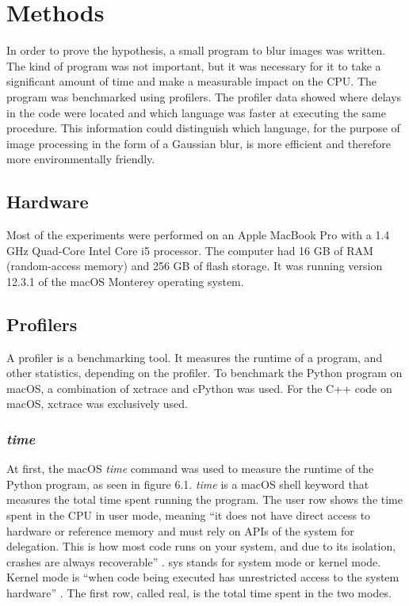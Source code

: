 \chapter{Methods}
In order to prove the hypothesis, a small program to blur images was written. The kind of program was not important, but it was necessary for it to take a significant amount of time and make a measurable impact on the CPU.
The program was benchmarked using profilers. The profiler data showed where delays in the code were located and which language was faster at executing the same procedure. This information could distinguish which language, for the purpose of image processing in the form of a Gaussian blur, is more efficient and therefore more environmentally friendly.

\section{Hardware}
Most of the experiments were performed on an Apple MacBook Pro with a 1.4 GHz Quad-Core Intel Core i5 processor. The computer had 16 GB of RAM (random-access memory) and 256 GB of flash storage. It was running version 12.3.1 of the macOS Monterey operating system.

\section{Profilers}
A profiler is a benchmarking tool. It measures the runtime of a program, and other statistics, depending on the profiler. To benchmark the Python program on macOS, a combination of xctrace and cPython was used. For the C++ code on macOS, xctrace was exclusively used.

\subsection{\textit{time}}
At first, the macOS \textit{time} command was used to measure the runtime of the Python program, as seen in figure 6.1.
\textit{time} is a macOS shell keyword that measures the total time spent running the program. The user row shows the time spent in the CPU in user mode, meaning “it does not have direct access to hardware or reference memory and must rely on APIs of the system for delegation. This is how most code runs on your system, and due to its isolation, crashes are always recoverable” \cite{time}. sys stands for system mode or kernel mode. Kernel mode is “when code being executed has unrestricted access to the system hardware” \cite{time}. The first row, called real, is the total time spent in the two modes.

